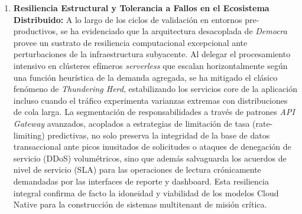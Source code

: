 \begin{enumerate}
    \item \textbf{Resiliencia Estructural y Tolerancia a Fallos en el Ecosistema Distribuido:}
    A lo largo de los ciclos de validación en entornos pre-productivos, se ha evidenciado que la arquitectura desacoplada de \textit{Democra} provee un sustrato de resiliencia computacional excepcional ante perturbaciones de la infraestructura subyacente. Al delegar el procesamiento intensivo en clústeres efímeros \textit{serverless} que escalan horizontalmente según una función heurística de la demanda agregada, se ha mitigado el clásico fenómeno de \textit{Thundering Herd}, estabilizando los servicios core de la aplicación incluso cuando el tráfico experimenta varianzas extremas con distribuciones de cola larga. La segmentación de responsabilidades a través de patrones \textit{API Gateway} avanzados, acoplados a estrategias de limitación de tasa (rate-limiting) predictivas, no solo preserva la integridad de la base de datos transaccional ante picos inusitados de solicitudes o ataques de denegación de servicio (DDoS) volumétricos, sino que además salvaguarda los acuerdos de nivel de servicio (SLA) para las operaciones de lectura crónicamente demandadas por las interfaces de reporte y dashboard. Esta resiliencia integral confirma de facto la idoneidad y viabilidad de los modelos Cloud Native para la construcción de sistemas multitenant de misión crítica.
\end{enumerate}
